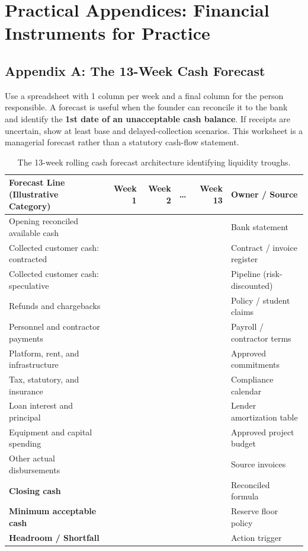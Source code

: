 \section*{Practical Appendices: Financial Instruments for Practice}

\subsection*{Appendix A: The 13-Week Cash Forecast}

Use a spreadsheet with 1 column per week and a final column for the person responsible. A forecast is useful when the founder can reconcile it to the bank and identify the \textbf{1st date of an unacceptable cash balance}. If receipts are uncertain, show at least base and delayed-collection scenarios. This worksheet is a managerial forecast rather than a statutory cash-flow statement.

\begin{table}[htbp]
\centering
\small
\begin{tabularx}{\textwidth}{Xrrrrp{3.5cm}}
\toprule
\textbf{Forecast Line (Illustrative Category)} & \textbf{Week 1} & \textbf{Week 2} & \textbf{\dots} & \textbf{Week 13} & \textbf{Owner / Source} \\
\midrule
Opening reconciled available cash & & & & & Bank statement \\
Collected customer cash: contracted & & & & & Contract / invoice register \\
Collected customer cash: speculative & & & & & Pipeline (risk-discounted) \\
Refunds and chargebacks & & & & & Policy / student claims \\
Personnel and contractor payments & & & & & Payroll / contractor terms \\
Platform, rent, and infrastructure & & & & & Approved commitments \\
Tax, statutory, and insurance & & & & & Compliance calendar \\
Loan interest and principal & & & & & Lender amortization table \\
Equipment and capital spending & & & & & Approved project budget \\
Other actual disbursements & & & & & Source invoices \\
\midrule
\textbf{Closing cash} & & & & & Reconciled formula \\
\textbf{Minimum acceptable cash} & & & & & Reserve floor policy \\
\midrule
\textbf{Headroom / Shortfall} & & & & & Action trigger \\
\bottomrule
\end{tabularx}
\caption{The 13-week rolling cash forecast architecture identifying liquidity troughs.}
\end{table}


